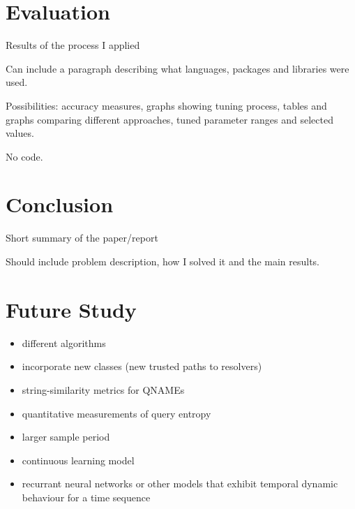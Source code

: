 \documentclass[conference]{IEEEtran}
\let\tightlist\relax %
\begin{document}
\section{Evaluation}\label{sec:evaluation}

\label{sec:evaluation}

Results of the process I applied

Can include a paragraph describing what languages, packages and
libraries were used.

Possibilities: accuracy measures, graphs showing tuning process, tables
and graphs comparing different approaches, tuned parameter ranges and
selected values.

No code.

\section{Conclusion}\label{sec:conclusion}

\label{sec:conclusion}

Short summary of the paper/report

Should include problem description, how I solved it and the main
results.

\section{Future Study}\label{sec:future-study}

\label{sec:future}

\begin{itemize}
\tightlist
\item
  different algorithms
\item
  incorporate new classes (new trusted paths to resolvers)
\item
  string-similarity metrics for QNAMEs
\item
  quantitative measurements of query entropy
\item
  larger sample period
\item
  continuous learning model
\item
  recurrant neural networks or other models that exhibit temporal
  dynamic behaviour for a time sequence
\end{itemize}
\end{document}
